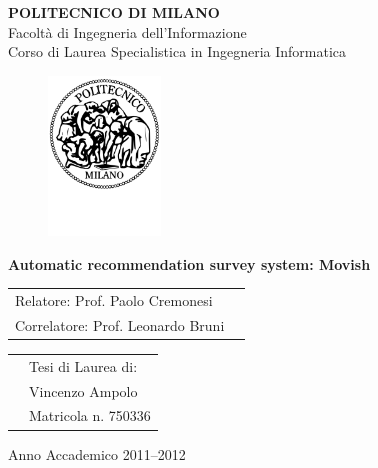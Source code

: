 \documentclass[a4paper]{report}
\begin{document}
\begin{titlepage}

\begin{center}
\LARGE
\textbf{POLITECNICO DI MILANO} \\
\Large
Facolt\`a di Ingegneria dell'Informazione \\
Corso di Laurea Specialistica in Ingegneria Informatica
\end{center}

\addvspace{1.5cm}
\begin{figure}[h]
\begin{center}
\includegraphics[width=3cm]{figures/PoliMi}
\end{center}
\end{figure}

\addvspace{0.75cm}
\begin{center}
\LARGE
\textbf{Automatic recommendation survey system: Movish}
\end{center}

\addvspace{4cm}
\Large
\begin{center}
\begin{tabular}{p{}p{}}
Relatore: Prof. Paolo Cremonesi & \\
Correlatore: Prof. Leonardo Bruni & \\
\end{tabular}
\end{center}

\addvspace{2cm}
\Large
\begin{center}
\begin{tabular}{p{}p{}}
& Tesi di Laurea di: \\
& Vincenzo Ampolo \\
& Matricola n. 750336
\end{tabular}
\end{center}

\vfill
\Large
\begin{center}
Anno Accademico 2011--2012
\end{center}

\end{titlepage}
\end{document}
